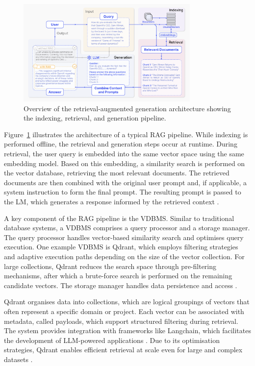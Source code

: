 \documentclass[a4paper,oneside,bibliography=totoc]{scrbook}
\begin{document}
\begin{figure}[t]
  \centering
  \includegraphics[width=0.8\textwidth]{figures/RAG.png}
  \caption[Overview of the retrieval-augmented generation architecture showing the indexing, retrieval, and generation pipeline]{Overview of the retrieval-augmented generation architecture showing the indexing, retrieval, and generation pipeline. \cite{Gao2024}}
  \label{fig:rag}
\end{figure}

Figure~\ref{fig:rag} illustrates the architecture of a typical \ac{RAG} pipeline. While indexing is performed offline, the retrieval and generation steps occur at runtime. During retrieval, the user query is embedded into the same vector space using the same embedding model. Based on this embedding, a similarity search is performed on the vector database, retrieving the most relevant documents. The retrieved documents are then combined with the original user prompt and, if applicable, a system instruction to form the final prompt. The resulting prompt is passed to the \ac{LM}, which generates a response informed by the retrieved context \cite{Gao2024}.

A key component of the \ac{RAG} pipeline is the \ac{VDBMS}. Similar to traditional database systems, a \ac{VDBMS} comprises a query processor and a storage manager. The query processor handles vector-based similarity search and optimises query execution. One example \ac{VDBMS} is Qdrant, which employs filtering strategies and adaptive execution paths depending on the size of the vector collection. For large collections, Qdrant reduces the search space through pre-filtering mechanisms, after which a brute-force search is performed on the remaining candidate vectors. The storage manager handles data persistence and access \cite{Pan2024,Qdrant2025}.

Qdrant organises data into collections, which are logical groupings of vectors that often represent a specific domain or project. Each vector can be associated with metadata, called payloads, which support structured filtering during retrieval. The system provides integration with frameworks like Langchain, which facilitates the development of LLM-powered applications \cite{LangChain2025d}. Due to its optimisation strategies, Qdrant enables efficient retrieval at scale even for large and complex datasets \cite{Pan2024,Qdrant2025}.
\end{document}
